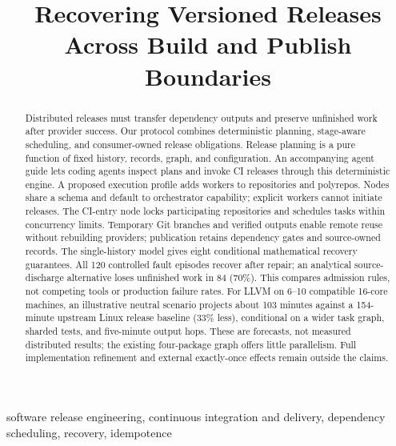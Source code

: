 \documentclass[10pt,conference]{IEEEtran}
\theoremstyle{definition}
\begin{document}
\title{Recovering Versioned Releases Across Build and Publish Boundaries}
\maketitle
\begin{abstract}
Distributed releases must transfer dependency outputs and preserve unfinished
work after provider success. Our protocol combines deterministic planning,
stage-aware scheduling, and consumer-owned release obligations.
Release planning is a pure function of fixed history, records, graph, and
configuration. An accompanying agent guide lets coding agents inspect plans
and invoke CI releases through this deterministic engine.
A proposed execution profile adds workers to repositories and polyrepos.
Nodes share a schema and default to orchestrator capability; explicit workers
cannot initiate releases. The CI-entry node locks participating repositories
and schedules tasks within concurrency limits. Temporary Git branches and
verified outputs enable remote reuse without rebuilding providers; publication retains dependency gates
and source-owned records.
The single-history model gives eight conditional mathematical recovery guarantees.
All 120 controlled fault episodes recover after repair; an analytical
source-discharge alternative loses unfinished work in 84 (70\%). This compares
admission rules, not competing tools or production failure rates.
For LLVM on 6--10 compatible 16-core machines, an illustrative neutral
scenario projects about 103 minutes against a 154-minute upstream Linux
release baseline (33\% less),
conditional on a wider task graph, sharded tests, and five-minute output hops.
These are forecasts, not measured distributed results; the existing
four-package graph offers little parallelism. Full implementation refinement
and external exactly-once effects remain outside the claims.
\end{abstract}
\begin{IEEEkeywords}
software release engineering, continuous integration and delivery,
dependency scheduling, recovery, idempotence
\end{IEEEkeywords}






\clearpage
{}

\end{document}
